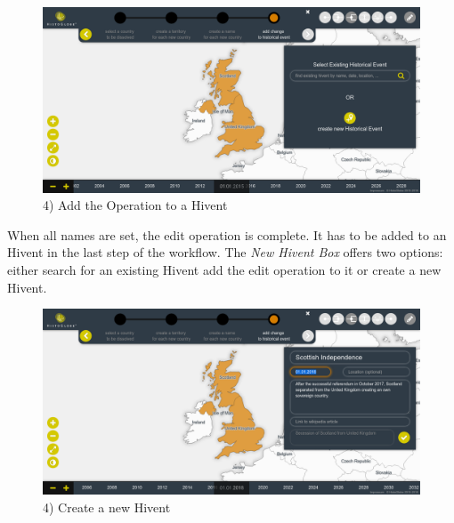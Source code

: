 \begin{landscape}
\begin{minipage}[t]{10cm}
    \begin{figure}[H]
      \centering
      \includegraphics[width=1.0\textwidth]{graphics/development/user_interface_design_process/6_add_change_to_hivent_1.png}
      \caption{4) Add the Operation to a Hivent}
      \label{fig:final_6_add_change_to_hivent_1}
    \end{figure}

    When all names are set, the edit operation is complete. It has to be added to an Hivent in the last step of the workflow. The \emph{New Hivent Box} offers two options: either search for an existing Hivent add the edit operation to it or create a new Hivent.

  \end{minipage}

  \vspace{1em}
  \begin{minipage}[t]{10cm}

    \begin{figure}[H]
      \centering
      \includegraphics[width=1.0\textwidth]{graphics/development/user_interface_design_process/7_add_change_to_hivent_2.png}
      \caption{4) Create a new Hivent}
      \label{fig:final_7_add_change_to_hivent_2}
    \end{figure}


\end{minipage}
\end{landscape}
